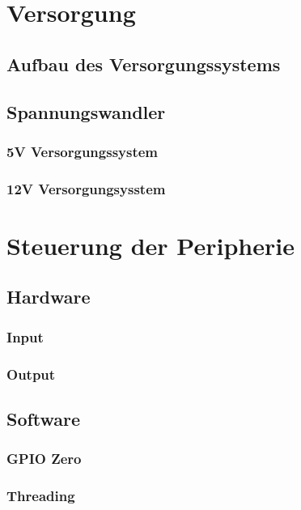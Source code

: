 \section{Versorgung}
\subsection{Aufbau des Versorgungssystems}
\subsection{Spannungswandler}
\subsubsection{5V Versorgungssystem}
\subsubsection{12V Versorgungsysstem}

\newpage


\section{Steuerung der Peripherie}
\subsection{Hardware}
\subsubsection{Input}
\subsubsection{Output}

\subsection{Software}
\subsubsection{GPIO Zero}
\subsubsection{Threading}

\newpage


